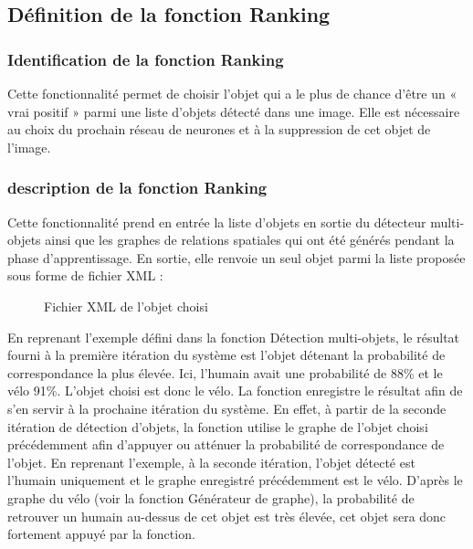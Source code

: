 \documentclass[debug,nodate,hideweeklyreports]{polytech/polytech}
\begin{document}
\subsection{Définition de la fonction Ranking}

\subsubsection{Identification de la fonction Ranking}

Cette fonctionnalité permet de choisir l’objet qui a le plus de chance d’être un « vrai positif » parmi une liste d’objets détecté dans une image. Elle est nécessaire au choix du prochain réseau de neurones et à la suppression de cet objet de l’image.

\subsubsection{description de la fonction Ranking}

Cette fonctionnalité prend en entrée la liste d’objets en sortie du détecteur multi-objets ainsi que les graphes de relations spatiales qui ont été générés pendant la phase d’apprentissage. En sortie, elle renvoie un seul objet parmi la liste proposée sous forme de fichier XML :

\begin{figure}
  \caption{Fichier XML de l'objet choisi}
  \label{fig:chosenxml}
\end{figure}

En reprenant l’exemple défini dans la fonction Détection multi-objets, le résultat fourni à la première itération du système est l’objet détenant la probabilité de correspondance la plus élevée. Ici, l’humain avait une probabilité de 88\% et le vélo 91\%. L’objet choisi est donc le vélo. La fonction enregistre le résultat afin de s’en servir à la prochaine itération du système. 
En effet, à partir de la seconde itération de détection d’objets, la fonction utilise le graphe de l’objet choisi précédemment afin d’appuyer ou atténuer la probabilité de correspondance de l’objet.
En reprenant l’exemple, à la seconde itération, l’objet détecté est l’humain uniquement et le graphe enregistré précédemment est le vélo. D’après le graphe du vélo (voir la fonction Générateur de graphe), la probabilité de retrouver un humain au-dessus de cet objet est très élevée, cet objet sera donc fortement appuyé par la fonction.
\end{document}
